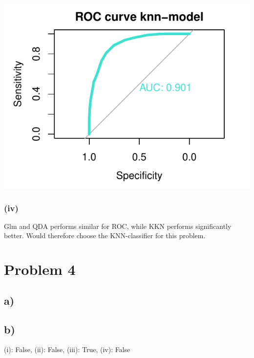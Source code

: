 \documentclass[
]{article}
\begin{document}
\begin{center}\includegraphics{Exercise1_files/figure-latex/unnamed-chunk-19-3} \end{center}

\hypertarget{iv}{%
\subsubsection{(iv)}\label{iv}}

Glm and QDA performs similar for ROC, while KKN performs significantly
better. Would therefore choose the KNN-classifier for this problem.

\hypertarget{problem-4}{%
\section{Problem 4}\label{problem-4}}

\hypertarget{a-2}{%
\subsection{a)}\label{a-2}}

\hypertarget{b-2}{%
\subsection{b)}\label{b-2}}

(i): False, (ii): False, (iii): True, (iv): False
\end{document}
